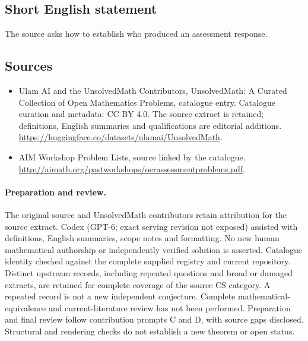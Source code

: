 \documentclass[11pt]{article}
\begin{document}
\subsection{Short English statement}
The source asks how to establish who produced an assessment response.
\subsection{Sources}
\begin{itemize}
\item[\hypertarget{source:statement:1}{S1}] Ulam AI and the UnsolvedMath Contributors, UnsolvedMath: A Curated Collection of Open Mathematics Problems, catalogue entry. Catalogue curation and metadata: CC BY 4.0. The source extract is retained; definitions, English summaries and qualifications are editorial additions.
\url{https://huggingface.co/datasets/ulamai/UnsolvedMath}.
\item[\hypertarget{source:statement:2}{S2}] AIM Workshop Problem Lists, source linked by the catalogue.
\url{http://aimath.org/pastworkshops/oerassessmentproblems.pdf}.
\end{itemize}
\paragraph{Preparation and review.}
The original source and UnsolvedMath contributors retain attribution for the source extract. Codex (GPT-6; exact serving revision not exposed) assisted with definitions, English summaries, scope notes and formatting. No new human mathematical authorship or independently verified solution is asserted. Catalogue identity checked against the complete supplied registry and current repository. Distinct upstream records, including repeated questions and broad or damaged extracts, are retained for complete coverage of the source CS category. A repeated record is not a new independent conjecture. Complete mathematical-equivalence and current-literature review has not been performed. Preparation and final review follow contribution prompts C and D, with source gaps disclosed. Structural and rendering checks do not establish a new theorem or open status.
\label{end:statement}
\end{document}

